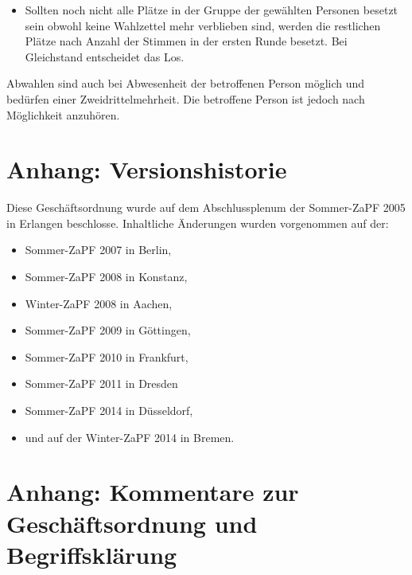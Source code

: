 \documentclass[12pt,oneside]{scrartcl}
\begin{document}
\begin{list}{.}
\begin{itemize}
\item Sollten noch nicht alle Plätze in der Gruppe der gewählten Personen
besetzt sein obwohl keine Wahlzettel mehr verblieben sind, werden
die restlichen Plätze nach Anzahl der Stimmen in der ersten Runde
besetzt. Bei Gleichstand entscheidet das Los.

\end{itemize}

\item Abwahlen sind auch bei Abwesenheit der betroffenen Person möglich und
bedürfen einer Zweidrittelmehrheit.
Die betroffene Person ist jedoch nach Möglichkeit anzuhören.
\end{list}


\section{Anhang: Versionshistorie%
  \label{anhang-versionshistorie}%
}

Diese Geschäftsordnung wurde auf dem Abschlussplenum der Sommer-ZaPF 2005 in
Erlangen beschlosse.
Inhaltliche Änderungen wurden vorgenommen auf der:
%
\begin{itemize}

\item Sommer-ZaPF 2007 in Berlin,

\item Sommer-ZaPF 2008 in Konstanz,

\item Winter-ZaPF 2008 in Aachen,

\item Sommer-ZaPF 2009 in Göttingen,

\item Sommer-ZaPF 2010 in Frankfurt,

\item Sommer-ZaPF 2011 in Dresden

\item Sommer-ZaPF 2014 in Düsseldorf,

\item und auf der Winter-ZaPF 2014 in Bremen.

\end{itemize}


\section{Anhang: Kommentare zur Geschäftsordnung und Begriffsklärung%
  \label{anhang-kommentare-zur-geschaftsordnung-und-begriffsklarung}%
}
\end{document}
